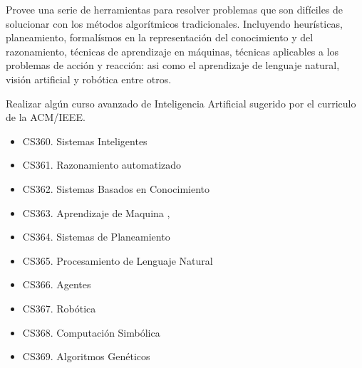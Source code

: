 \begin{syllabus}


\begin{justification}
Provee una serie de herramientas para resolver problemas que son difíciles de solucionar con los métodos algorítmicos tradicionales. Incluyendo heurísticas, planeamiento, formalísmos en la representación del conocimiento y del razonamiento, técnicas de aprendizaje en máquinas, técnicas aplicables a los problemas de acción y reacción: asi como el aprendizaje de lenguaje natural, visión artificial y robótica entre otros. 
\end{justification}

\begin{goals}
\item Realizar algún curso avanzado de Inteligencia Artificial sugerido por el curriculo de la ACM/IEEE.
\end{goals}

\begin{outcomes}
\end{outcomes}

\begin{itemize}
\item CS360. Sistemas Inteligentes
\item CS361. Razonamiento automatizado
\item CS362. Sistemas Basados en Conocimiento
\item CS363. Aprendizaje de Maquina \cite{Russell03},\cite{Haykin99}
\item CS364. Sistemas de Planeamiento
\item CS365. Procesamiento de Lenguaje Natural
\item CS366. Agentes
\item CS367. Robótica
\item CS368. Computación Simbólica
\item CS369. Algoritmos Genéticos \cite{Goldberg89}
\end{itemize}



\begin{coursebibliography}
\end{coursebibliography}

\end{syllabus}

